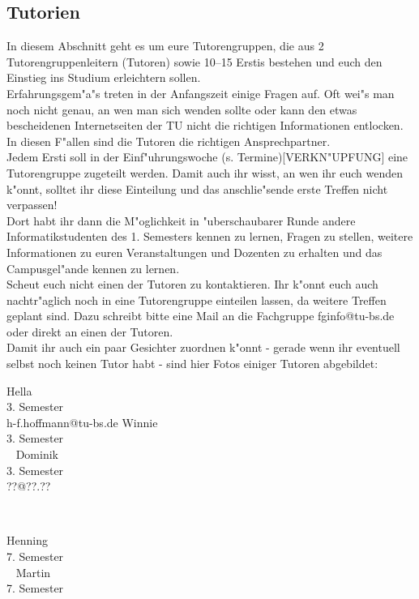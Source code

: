 \subsection{Tutorien}

In diesem Abschnitt geht es um eure Tutorengruppen, die aus 2 Tutorengruppenleitern (Tutoren) sowie 10--15 Erstis bestehen und euch den Einstieg ins Studium erleichtern sollen.\\
Erfahrungsgem"a"s treten in der Anfangszeit einige Fragen auf. Oft wei"s man noch nicht genau, an wen man sich wenden sollte oder kann den etwas bescheidenen Internetseiten der TU nicht die richtigen Informationen entlocken. In diesen F"allen sind die Tutoren die richtigen Ansprechpartner.\\
Jedem Ersti soll in der Einf"uhrungswoche (s. Termine)[VERKN"UPFUNG] eine Tutorengruppe zugeteilt werden. Damit auch ihr wisst, an wen ihr euch wenden k"onnt, solltet ihr diese Einteilung und das anschlie"sende erste Treffen nicht verpassen!\\
Dort habt ihr dann die M"oglichkeit in "uberschaubarer Runde andere Informatikstudenten des 1. Semesters kennen zu lernen, Fragen zu stellen, weitere Informationen zu euren Veranstaltungen und Dozenten zu erhalten und das Campusgel"ande kennen zu lernen.\\
Scheut euch nicht einen der Tutoren zu kontaktieren. Ihr k"onnt euch auch nachtr"aglich noch in eine Tutorengruppe einteilen lassen, da weitere Treffen geplant sind. Dazu schreibt bitte eine Mail an die Fachgruppe fginfo@tu-bs.de oder direkt an einen der Tutoren.\\
Damit ihr auch ein paar Gesichter zuordnen k"onnt - gerade wenn ihr eventuell selbst noch keinen Tutor habt - sind hier Fotos einiger Tutoren abgebildet:

\onecolumn


{Hella\\3. Semester\\h-f.hoffmann@tu-bs.de}
\hfill
{}
{Winnie\\3. Semester\\ ~ }
\hfill
{}
{Dominik\\3. Semester\\??@??.??}
\par \ \par
{}
{Henning\\7. Semester\\ ~}
\hfill
{}
{Martin\\7. Semester\\ ~}
\par \ \par

\twocolumn